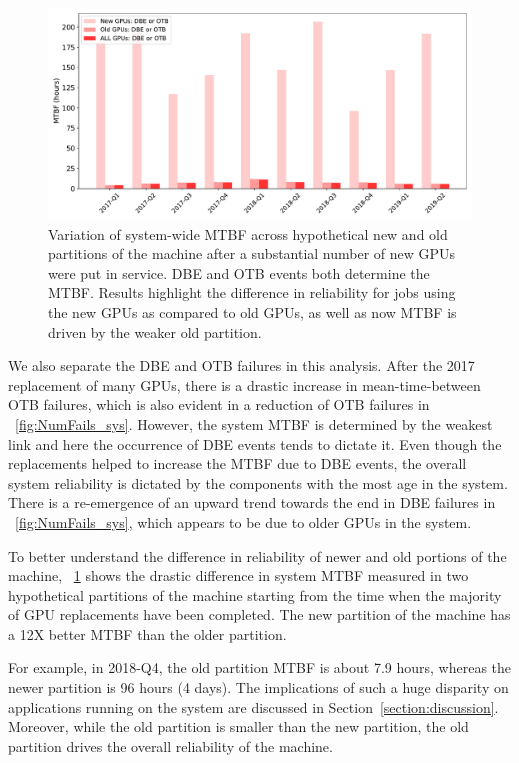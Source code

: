 \begin{figure}[bt]
  \begin{center}
    \includegraphics[trim={0 1em 0 1em},clip,width=\columnwidth]{figs/MTBF_quaterly_sys_NewOldALL.pdf}
  \end{center}
  \caption{Variation of system-wide MTBF across hypothetical new and
    old partitions of the machine after a substantial number of new GPUs
were put in service.
DBE and OTB events both determine the MTBF.
Results highlight the difference in reliability for jobs using the new GPUs as compared to old GPUs,
as well as now MTBF is driven by the weaker old partition.}
  \label{fig:MTBF_sys_NewOld}
\end{figure}
We also separate the DBE and OTB failures in this analysis. After the
2017 replacement of many GPUs, there is a drastic increase in
mean-time-between OTB failures, which is also evident in a reduction of OTB failures in ~\ref{fig:NumFails_sys}.
However, the system MTBF is determined by the weakest link and here the occurrence of DBE events tends to dictate it.
Even though the replacements helped to increase the MTBF due to DBE events, the overall system 
reliability is dictated by the components with the most age in the
system. There is a re-emergence of an upward trend towards 
the end in DBE failures in ~\ref{fig:NumFails_sys}, which
appears to be due to older GPUs in the system. 

To better understand the difference in reliability of newer and old portions of the machine, 
~\ref{fig:MTBF_sys_NewOld} shows the drastic difference in system MTBF measured in two hypothetical
partitions of the machine starting from the time when the majority of GPU replacements have been completed. 
The new partition of the machine has a 12X better MTBF than the older
partition.

For example, in 2018-Q4, the old partition MTBF is about 7.9 hours,
whereas the newer partition is 96 hours (4 days). The implications of such a huge disparity on applications running on the 
system are discussed in
Section~\ref{section:discussion}. Moreover, while the old partition is
smaller than the new partition, the old partition drives the overall reliability of
the machine.
